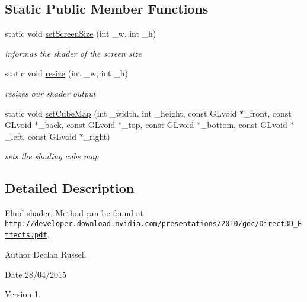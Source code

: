\subsection*{Static Public Member Functions}
\begin{DoxyCompactItemize}
\item 
static void \hyperlink{class_fluid_shader_a59302f1395ebd10872da9eb9d733d749}{set\-Screen\-Size} (int \-\_\-w, int \-\_\-h)
\begin{DoxyCompactList}\small\item\em informas the shader of the screen size \end{DoxyCompactList}\item 
static void \hyperlink{class_fluid_shader_a46a269869d9c2efa74a8e89d7a8e4960}{resize} (int \-\_\-w, int \-\_\-h)
\begin{DoxyCompactList}\small\item\em resizes our shader output \end{DoxyCompactList}\item 
static void \hyperlink{class_fluid_shader_a1e3a4859b77f0420d2ae201c3f09b5f4}{set\-Cube\-Map} (int \-\_\-width, int \-\_\-height, const G\-Lvoid $\ast$\-\_\-front, const G\-Lvoid $\ast$\-\_\-back, const G\-Lvoid $\ast$\-\_\-top, const G\-Lvoid $\ast$\-\_\-bottom, const G\-Lvoid $\ast$\-\_\-left, const G\-Lvoid $\ast$\-\_\-right)
\begin{DoxyCompactList}\small\item\em sets the shading cube map \end{DoxyCompactList}\end{DoxyCompactItemize}


\subsection{Detailed Description}
Fluid shader. Method can be found at \href{http://developer.download.nvidia.com/presentations/2010/gdc/Direct3D_Effects.pdf}{\tt http\-://developer.\-download.\-nvidia.\-com/presentations/2010/gdc/\-Direct3\-D\-\_\-\-Effects.\-pdf}. 

\begin{DoxyAuthor}{Author}
Declan Russell 
\end{DoxyAuthor}
\begin{DoxyDate}{Date}
28/04/2015 
\end{DoxyDate}
\begin{DoxyVersion}{Version}
1. 
\end{DoxyVersion}


